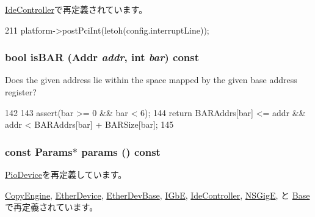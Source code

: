 \hyperlink{classIdeController_aba6fa755ca152cedafeb4150da6a2493}{IdeController}で再定義されています。


\begin{DoxyCode}
211     { platform->postPciInt(letoh(config.interruptLine)); }
\end{DoxyCode}
\hypertarget{classPciDevice_ac8b92b4f9f4b7ec34ee7994cabdddc67}{
\subsubsection[{isBAR}]{\setlength{\rightskip}{0pt plus 5cm}bool isBAR ({\bf Addr} {\em addr}, \/  int {\em bar}) const}}
\label{classPciDevice_ac8b92b4f9f4b7ec34ee7994cabdddc67}
Does the given address lie within the space mapped by the given base address register? 


\begin{DoxyCode}
142     {
143         assert(bar >= 0 && bar < 6);
144         return BARAddrs[bar] <= addr && addr < BARAddrs[bar] + BARSize[bar];
145     }
\end{DoxyCode}
\hypertarget{classPciDevice_acd3c3feb78ae7a8f88fe0f110a718dff}{
\subsubsection[{params}]{\setlength{\rightskip}{0pt plus 5cm}const {\bf Params}$\ast$ params () const}}
\label{classPciDevice_acd3c3feb78ae7a8f88fe0f110a718dff}


\hyperlink{classPioDevice_acd3c3feb78ae7a8f88fe0f110a718dff}{PioDevice}を再定義しています。

\hyperlink{classCopyEngine_acd3c3feb78ae7a8f88fe0f110a718dff}{CopyEngine}, \hyperlink{classEtherDevice_acd3c3feb78ae7a8f88fe0f110a718dff}{EtherDevice}, \hyperlink{classEtherDevBase_a24c177ef5d1124c3ff3e68a7e53532cf}{EtherDevBase}, \hyperlink{classIGbE_acd3c3feb78ae7a8f88fe0f110a718dff}{IGbE}, \hyperlink{classIdeController_acd3c3feb78ae7a8f88fe0f110a718dff}{IdeController}, \hyperlink{classNSGigE_acd3c3feb78ae7a8f88fe0f110a718dff}{NSGigE}, と \hyperlink{classSinic_1_1Base_acd3c3feb78ae7a8f88fe0f110a718dff}{Base}で再定義されています。


